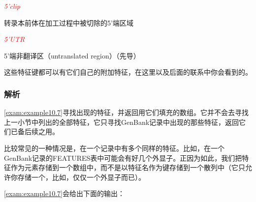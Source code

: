 \textcolor{red}{\textit{5'clip}}
\begin{adjustwidth}{4em}{}
转录本前体在加工过程中被切除的5'端区域
\end{adjustwidth}

\textcolor{red}{\textit{5'UTR}}
\begin{adjustwidth}{4em}{}
5'端非翻译区（untranslated region）（先导）
\end{adjustwidth}

这些特征键都可以有它们自己的附加特征，在这里以及后面的联系中你会看到的。

\subsubsection{解析}
\autoref{exam:example10.7}寻找出现的特征，并返回用它们填充的数组。它并不会去寻找上一小节中列出的全部特征，它只寻找GenBank记录中出现的那些特征，返回它们已备后续之用。

比较常见的一种情况是，在一个记录中有多个同样的特征。比如，在一个GenBank记录的FEATURES表中可能会有好几个外显子。正因为如此，我们把特征作为元素存储到一个数组中，而不是以特征名作为键存储到一个散列中（它只允许你存储一个，比如，仅仅一个外显子而已）。



\autoref{exam:example10.7}会给出下面的输出：

